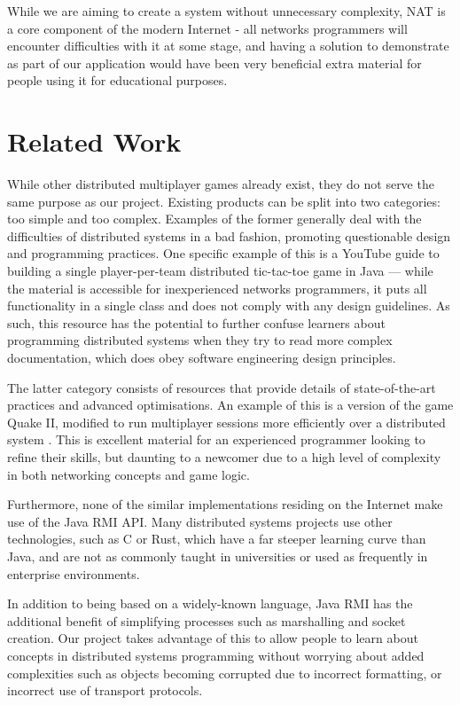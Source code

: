 \documentclass[conference]{IEEEtran}
\begin{document}
While we are aiming to create a system without unnecessary complexity, NAT is a core component of the modern Internet - all networks programmers will encounter difficulties with it at some stage, and having a solution to demonstrate as part of our application would have been very beneficial extra material for people using it for educational purposes.

\section{Related Work}
While other distributed multiplayer games already exist, they do not serve the same
purpose as our project. Existing products can be split into two categories: too simple and too complex. Examples of the former generally deal with the difficulties of distributed systems in a bad fashion, promoting questionable design and programming practices. One specific example of this is a YouTube guide to building a single player-per-team distributed tic-tac-toe game in Java \cite{MrWayFarOutYoutube15} --- while the material is accessible for inexperienced networks programmers, it puts all functionality in a single class and does not comply with any design guidelines. As such, this resource has the potential to further confuse learners about programming distributed systems when they try to read more complex documentation, which does obey software engineering design principles.

The latter category consists of resources that provide details of state-of-the-art practices and advanced optimisations. An example of this is a version of the game Quake II, modified to run multiplayer sessions more efficiently over a distributed system \cite{DBLP:conf/nsdi/BharambePS06}. This is excellent material for an experienced programmer looking to refine their skills, but daunting to a newcomer due to a high level of complexity in both networking concepts and game logic.

Furthermore, none of the similar implementations residing on the Internet make use of the Java RMI API. Many distributed systems projects use other technologies, such as C or Rust, which have a far steeper learning curve than Java, and are not as commonly taught in universities or used as frequently in enterprise environments.

In addition to being based on a widely-known language, Java RMI has the additional benefit of simplifying processes such as marshalling and socket creation. Our project takes advantage of this to allow people to learn about concepts in distributed systems programming without worrying about added complexities such as objects becoming corrupted due to incorrect formatting, or incorrect use of transport protocols.
\end{document}
